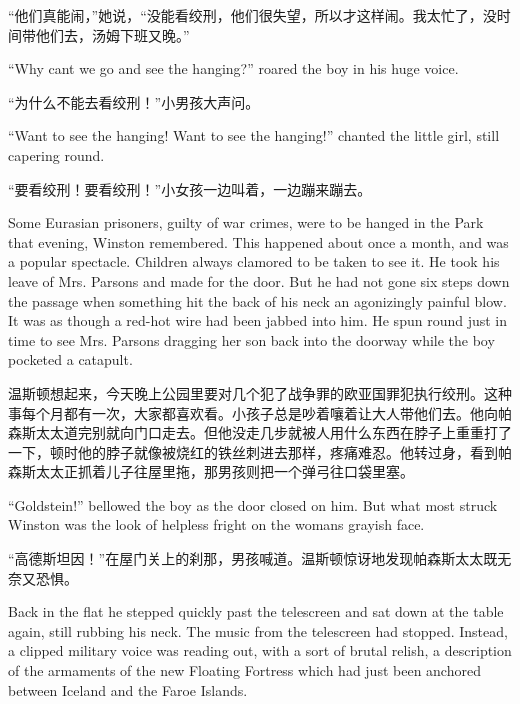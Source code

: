 \begin{paracol}{2}
\switchcolumn

``他们真能闹，''她说，``没能看绞刑，他们很失望，所以才这样闹。我太忙了，没时间带他们去，汤姆下班又晚。''

\switchcolumn*

``Why can\textquotesingle t we go and see the hanging?'' roared the boy in
his huge voice.

\switchcolumn

``为什么不能去看绞刑！''小男孩大声问。

\switchcolumn*

``Want to see the hanging! Want to see the hanging!'' chanted the little
girl, still capering round.

\switchcolumn

``要看绞刑！要看绞刑！''小女孩一边叫着，一边蹦来蹦去。

\switchcolumn*

Some Eurasian prisoners, guilty of war crimes, were to be hanged in the
Park that evening, Winston remembered. This happened about once a month,
and was a popular spectacle. Children always clamored to be taken to see
it. He took his leave of Mrs. Parsons and made for the door. But he had
not gone six steps down the passage when something hit the back of his
neck an agonizingly painful blow. It was as though a red-hot wire had
been jabbed into him. He spun round just in time to see Mrs. Parsons
dragging her son back into the doorway while the boy pocketed a
catapult.

\switchcolumn

温斯顿想起来，今天晚上公园里要对几个犯了战争罪的欧亚国罪犯执行绞刑。这种事每个月都有一次，大家都喜欢看。小孩子总是吵着嚷着让大人带他们去。他向帕森斯太太道完别就向门口走去。但他没走几步就被人用什么东西在脖子上重重打了一下，顿时他的脖子就像被烧红的铁丝刺进去那样，疼痛难忍。他转过身，看到帕森斯太太正抓着儿子往屋里拖，那男孩则把一个弹弓往口袋里塞。

\switchcolumn*

``Goldstein!'' bellowed the boy as the door closed on him. But what most
struck Winston was the look of helpless fright on the
woman\textquotesingle s grayish face.

\switchcolumn

``高德斯坦因！''在屋门关上的刹那，男孩喊道。温斯顿惊讶地发现帕森斯太太既无奈又恐惧。

\switchcolumn*

Back in the flat he stepped quickly past the telescreen and sat down at
the table again, still rubbing his neck. The music from the telescreen
had stopped. Instead, a clipped military voice was reading out, with a
sort of brutal relish, a description of the armaments of the new
Floating Fortress which had just been anchored between Iceland and the
Faroe Islands.


\end{paracol}
